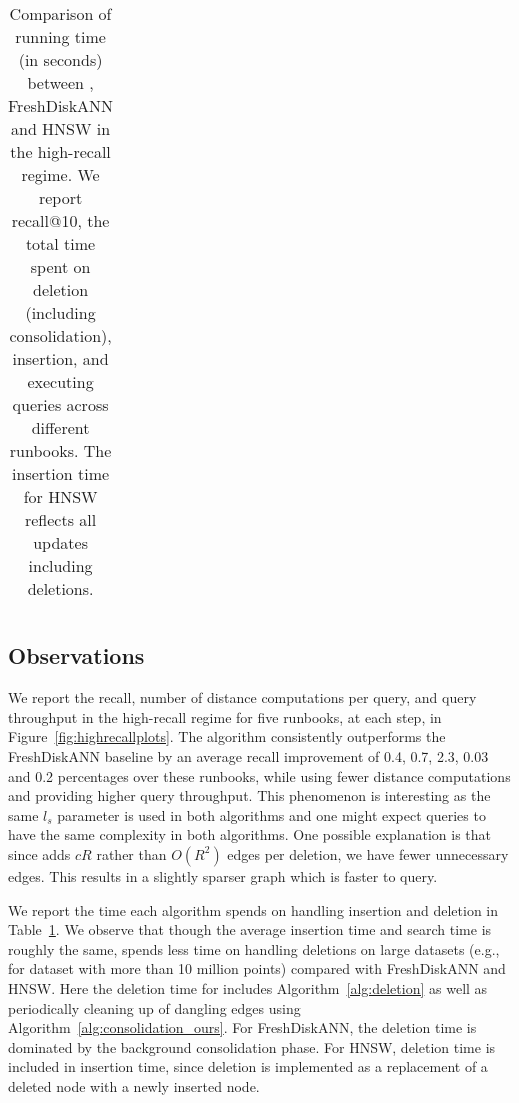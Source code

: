\begin{table}[t]
\begin{tabular}{p{1.5cm}|c|c|c|c|c}
\bottomrule
\end{tabular}
\caption{Comparison of running time (in seconds) between \name,
FreshDiskANN and HNSW in the high-recall regime. 
We report recall@10, the total time spent
on deletion (including consolidation), insertion, and executing queries across different runbooks.
The insertion time for HNSW reflects all updates including deletions.
\vspace{-10pt}
}
\label{tab:running_time_highrecall}
\end{table}

\subsection{Observations}
We report the recall, number of distance computations per query, and query throughput
in the high-recall regime for five runbooks, at each step,
in Figure~\ref{fig:highrecallplots}. 
The \name algorithm consistently outperforms the FreshDiskANN baseline by an
average recall improvement of 0.4, 0.7, 2.3, 0.03 and 0.2 percentages over these runbooks,
while using fewer distance computations and providing higher query throughput.
This phenomenon is interesting as the same $l_s$ parameter is used in both algorithms
and one might expect queries to have the same complexity in both algorithms.
One possible explanation is that since \name adds $cR$ rather than $O(R^2)$
edges per deletion, we have fewer unnecessary edges. This results in a slightly sparser
graph which is faster to query.

We report the time each algorithm spends on handling insertion and deletion in Table~\ref{tab:running_time_highrecall}. We observe that though the average
insertion time and search time is roughly the same, \name spends less time
on handling deletions on large datasets
(e.g., for dataset with more than 10 million points) compared with FreshDiskANN and HNSW.
Here the deletion time for \name includes Algorithm~\ref{alg:deletion} 
as well as periodically cleaning up of dangling edges using Algorithm~\ref{alg:consolidation_ours}.
For FreshDiskANN, the deletion time is dominated by the background
consolidation phase. For HNSW, deletion time is included in insertion time, since deletion is implemented as a replacement of a deleted node with a newly inserted node. 



